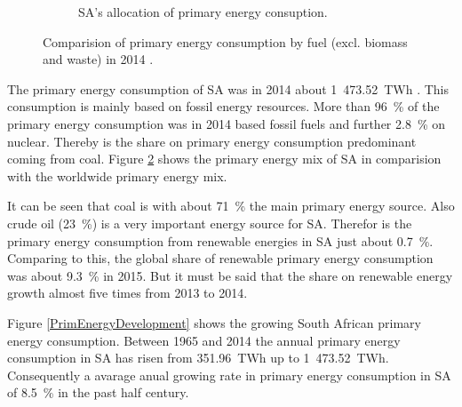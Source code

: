 \begin{figure}[!b]
\begin{subfigure}[b]{0.45\textwidth}
                \caption{SA's allocation of primary energy consuption.}\label{PrimSA}
        \end{subfigure}
\caption[Comparision of primary energy consumption by fuel in 2014.]{Comparision of primary energy consumption by fuel (excl. biomass and waste) in 2014 \cite{BP2015b}.}\label{PEKreis}
\end{figure}
The primary energy consumption of SA was in 2014 about 1~473.52~TWh \cite{BP2015b}. This consumption is mainly based on fossil energy resources. More than 96~\% of the primary energy consumption was in 2014 based fossil fuels and further 2.8~\% on nuclear. Thereby is the share on primary energy consumption predominant coming from coal. Figure \ref{PEKreis} shows the primary energy mix of SA in comparision with the worldwide primary energy mix. \cite{BP2015b}

It can be seen that coal is with about 71~\% the main primary energy source. Also crude oil (23~\%) is a very important energy source for SA. Therefor is the primary energy consumption from renewable energies in SA just about 0.7~\%. Comparing to this, the global share of  renewable primary energy consumption was about 9.3~\% in 2015. But it must be said that the share on renewable energy growth almost five times from 2013 to 2014. \cite{BP2015b}

Figure \ref{PrimEnergyDevelopment} shows the growing South African primary energy consumption. Between 1965 and 2014 the annual primary energy consumption in SA has risen from 351.96~TWh up to 1~473.52~TWh. Consequently a avarage anual growing rate in primary energy consumption in SA of 8.5~\% in the past half century. \cite{BP2015c}

